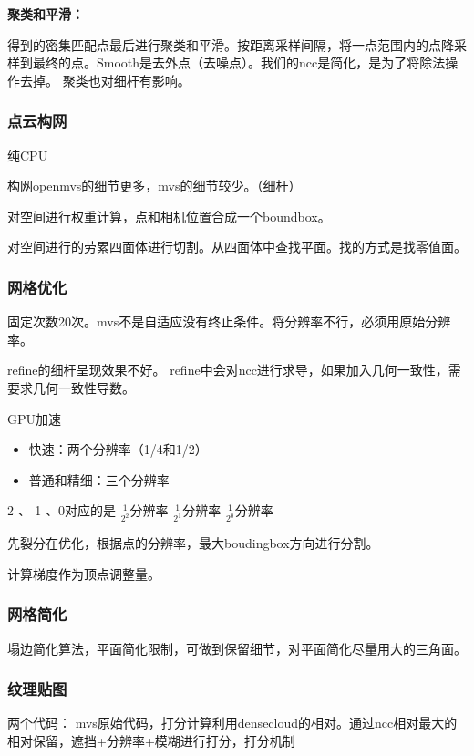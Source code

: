 \textbf{聚类和平滑：}

得到的密集匹配点最后进行聚类和平滑。按距离采样间隔，将一点范围内的点降采样到最终的点。Smooth是去外点（去噪点）。我们的ncc是简化，是为了将除法操作去掉。
聚类也对细杆有影响。

\subsubsection{点云构网}
纯CPU

构网openmvs的细节更多，mvs的细节较少。（细杆）

对空间进行权重计算，点和相机位置合成一个boundbox。

对空间进行的劳累四面体进行切割。从四面体中查找平面。找的方式是找零值面。


\subsubsection{网格优化}

固定次数20次。mvs不是自适应没有终止条件。将分辨率不行，必须用原始分辨率。

refine的细杆呈现效果不好。
refine中会对ncc进行求导，如果加入几何一致性，需要求几何一致性导数。

GPU加速

\begin{itemize}
	\item 快速：两个分辨率（1/4和1/2）
	\item 普通和精细：三个分辨率
\end{itemize}

2 、 1 、0对应的是
$\frac{1}{2^2}$分辨率
$\frac{1}{2^1}$分辨率
$\frac{1}{2^0}$分辨率

先裂分在优化，根据点的分辨率，最大boudingbox方向进行分割。

计算梯度作为顶点调整量。


\subsubsection{网格简化}

塌边简化算法，平面简化限制，可做到保留细节，对平面简化尽量用大的三角面。

\subsubsection{纹理贴图}

两个代码：
mvs原始代码，打分计算利用densecloud的相对。通过ncc相对最大的相对保留，遮挡+分辨率+模糊进行打分，打分机制

